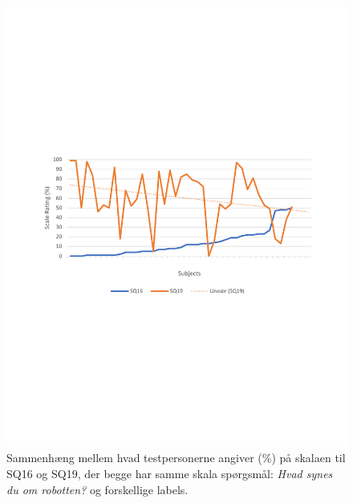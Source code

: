 \begin{figure}[H]
	\centering
	\includegraphics[width=\textwidth]{Figure/Korrelationsgrafer/SQ16+SQ19}
	\caption{Sammenhæng mellem hvad testpersonerne angiver (\%) på skalaen til SQ16 og SQ19, der begge har samme skala spørgsmål: \textit{Hvad synes du om robotten?} og forskellige labels.}
	\label{fig:SammenligningSQ16SQ19}
\end{figure}
\noindent
%
